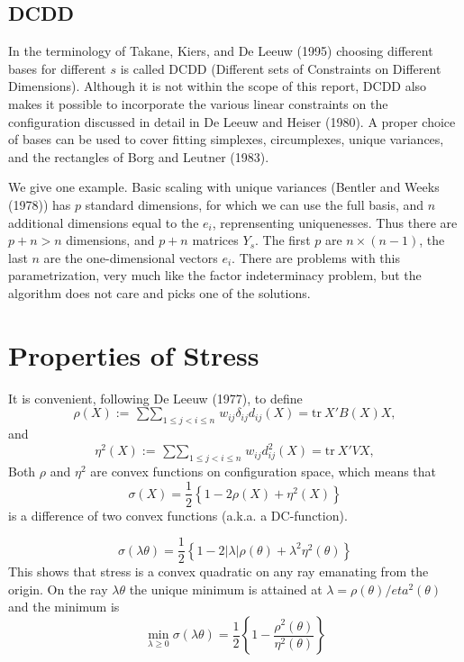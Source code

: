 \documentclass[
  12pt,
]{article}
\newcommand{\jis}{\mathop{\sum\sum}_{1\leq j<i\leq n}}
\begin{document}
\subsection{DCDD}\label{dcdd}

In the terminology of Takane, Kiers, and De Leeuw (1995) choosing different bases for different \(s\) is called DCDD (Different sets of Constraints on Different Dimensions). Although it is not within the scope of this report, DCDD also makes it possible to incorporate the various linear constraints on the configuration discussed in detail in De Leeuw and Heiser (1980). A proper choice of bases can be used to cover fitting simplexes, circumplexes, unique variances, and the rectangles of Borg and Leutner (1983).

We give one example. Basic scaling with unique variances (Bentler and Weeks (1978)) has \(p\) standard
dimensions, for which we can use the full basis, and \(n\) additional dimensions equal to the \(e_i\),
reprensenting uniquenesses. Thus there are \(p+n>n\) dimensions, and \(p+n\) matrices \(Y_s\). The
first \(p\) are \(n\times(n-1)\), the last \(n\) are the one-dimensional vectors \(e_i\). There are problems
with this parametrization, very much like the factor indeterminacy problem, but the algorithm
does not care and picks one of the solutions.

\section{Properties of Stress}\label{properties-of-stress}

It is convenient, following De Leeuw (1977), to define
\begin{equation}
\rho(X):=\jis w_{ij}\delta_{ij}d_{ij}(X)=\text{tr}\ X'B(X)X,
\label{eq:rhodefconf}
\end{equation}
and
\begin{equation}
\eta^2(X):=\jis w_{ij}d_{ij}^2(X)=\text{tr}\ X'VX,
\label{eq:eta2defconf}
\end{equation}
Both \(\rho\) and \(\eta^2\) are convex functions on configuration space, which means that
\begin{equation}
\sigma(X)=\frac12\left\{1-2\rho(X)+\eta^2(X)\right\}
\label{eq:sdcdef}
\end{equation}
is a difference of two convex functions (a.k.a. a DC-function).

\[
\sigma(\lambda\theta)=\frac12\left\{1-2|\lambda|\rho(\theta)+\lambda^2\eta^2(\theta)\right\}
\]
This shows that stress is a convex quadratic on any ray emanating from the origin. On the ray \(\lambda\theta\) the unique minimum is attained at \(\lambda=\rho(\theta)/eta^2(\theta)\)
and the minimum is
\[
\min_{\lambda\geq 0}\sigma(\lambda\theta)=\frac12\left\{1-\frac{\rho^2(\theta)}{\eta^2(\theta)}\right\}
\]
\end{document}

